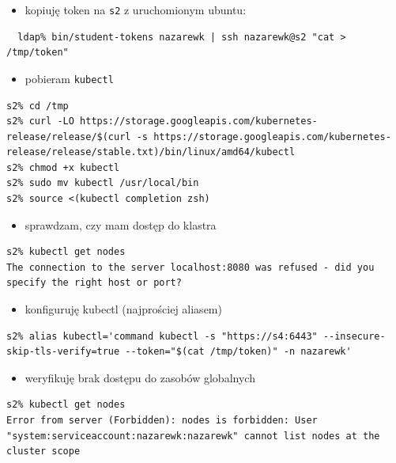\documentclass[a4paper,12pt,twoside,openany]{report}
\providecommand{\tightlist}{%
  \setlength{\itemsep}{0pt}\setlength{\parskip}{0pt}}
\newcommand{\passthrough}[1]{#1}
\begin{document}
\begin{itemize}
\tightlist
\item
  kopiuję token na \passthrough{\lstinline!s2!} z uruchomionym ubuntu:
\end{itemize}

\begin{lstlisting}
  ldap% bin/student-tokens nazarewk | ssh nazarewk@s2 "cat > /tmp/token"
\end{lstlisting}

\begin{itemize}
\tightlist
\item
  pobieram \passthrough{\lstinline!kubectl!}
\end{itemize}

\begin{lstlisting}
s2% cd /tmp
s2% curl -LO https://storage.googleapis.com/kubernetes-release/release/$(curl -s https://storage.googleapis.com/kubernetes-release/release/stable.txt)/bin/linux/amd64/kubectl
s2% chmod +x kubectl
s2% sudo mv kubectl /usr/local/bin
s2% source <(kubectl completion zsh)
\end{lstlisting}

\begin{itemize}
\tightlist
\item
  sprawdzam, czy mam dostęp do klastra
\end{itemize}

\begin{lstlisting}
s2% kubectl get nodes
The connection to the server localhost:8080 was refused - did you specify the right host or port?
\end{lstlisting}

\begin{itemize}
\tightlist
\item
  konfiguruję kubectl (najprościej aliasem)
\end{itemize}

\begin{lstlisting}
s2% alias kubectl='command kubectl -s "https://s4:6443" --insecure-skip-tls-verify=true --token="$(cat /tmp/token)" -n nazarewk'
\end{lstlisting}

\begin{itemize}
\tightlist
\item
  weryfikuję brak dostępu do zasobów globalnych
\end{itemize}

\begin{lstlisting}
s2% kubectl get nodes
Error from server (Forbidden): nodes is forbidden: User "system:serviceaccount:nazarewk:nazarewk" cannot list nodes at the cluster scope
\end{lstlisting}
\end{document}
